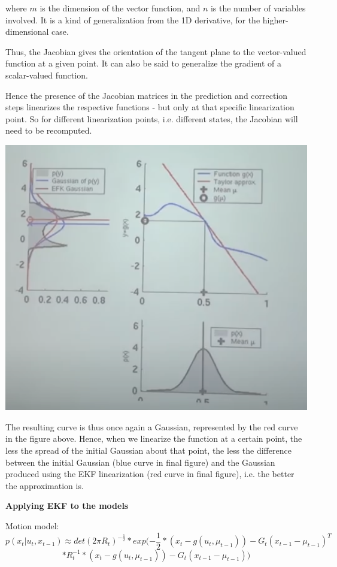 \documentclass[a4paper]{article}
\begin{document}
where $m$ is the dimension of the vector function, and $n$ is the number of variables involved. It is a kind of generalization from the 1D derivative, for the higher-dimensional case.

Thus, the Jacobian gives the orientation of the tangent plane to the vector-valued function at a given point. It can also be said to generalize the gradient of a scalar-valued function.

Hence the presence of the Jacobian matrices in the prediction and correction steps linearizes the respective functions - but only at that specific linearization point. So for different linearization points, i.e. different states, the Jacobian will need to be recomputed.

\begin{center}
    \includegraphics[scale=0.5]{ekfdist}
\end{center}

The resulting curve is thus once again a Gaussian, represented by the red curve in the figure above. Hence, when we linearize the function at a certain point, the less the spread of the initial Gaussian about that point, the less the difference between the initial Gaussian (blue curve in final figure) and the Gaussian produced using the EKF linearization (red curve in final figure), i.e. the better the approximation is.

\textbf{Applying EKF to the models}

Motion model:
\begin{equation*}
    p(x_t| u_t, x_{t-1}) \approx det(2\pi R_t)^{-\frac{1}{2}} * exp(-\frac{1}{2} * (x_t - g(u_t, \mu_{t-1})) - G_t(x_{t-1} - \mu_{t-1})^T 
\end{equation*}
\begin{equation*}
    * R_t^{-1} * (x_t - g(u_t, \mu_{t-1})) - G_t(x_{t-1} - \mu_{t-1}) )
\end{equation*}
\end{document}
